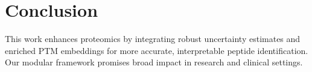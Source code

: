 \documentclass[10pt]{article}
\begin{document}
\vspace{1em}

\section*{Conclusion}
This work enhances proteomics by integrating robust uncertainty estimates and enriched PTM embeddings for more accurate, interpretable peptide identification. Our modular framework promises broad impact in research and clinical settings.
\end{document}
